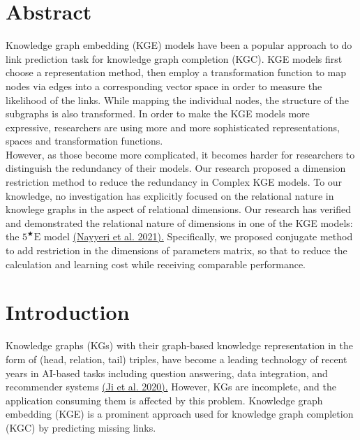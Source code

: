 \documentclass[9pt]{ctexart}
\theoremstyle{definition}
\begin{document}

\section{Abstract}
Knowledge graph embedding (KGE) models have been a popular approach to do link prediction task for knowledge graph completion (KGC).
KGE models first choose a representation method, then employ a transformation function to map nodes via edges into a corresponding vector space in order to measure the likelihood of the links.
While mapping the individual nodes, the structure of the subgraphs is also transformed.
In order to make the KGE models more expressive, researchers are using more and more sophisticated representations, spaces and transformation functions.\\
However, as those become more complicated, it becomes harder for researchers to distinguish the redundancy of their models.
Our research proposed a dimension restriction method to reduce the redundancy in Complex KGE models.
To our knowledge, no investigation has explicitly focused on the relational nature in knowlege graphs in the aspect of relational dimensions.
Our research has verified and demonstrated the relational nature of dimensions in one of the KGE models: the $5^{\bigstar}\mathrm{E}$ model
\hyperlink{Nay21}{(Nayyeri et al. 2021).}
Specifically, we proposed conjugate method to add restriction in the dimensions of parameters matrix, so that to reduce the calculation and learning cost while receiving comparable performance.

\section{Introduction}
Knowledge graphs (KGs) with their graph-based knowledge representation in the form of (head, relation, tail) triples, have become a leading technology of recent years in AI-based tasks including question answering, data integration, and recommender systems 
\hyperlink{JiS20}{(Ji et al. 2020).} 
However, KGs are incomplete, and the application consuming them is affected by this problem.
Knowledge graph embedding (KGE) is a prominent approach used for knowledge graph completion (KGC) by predicting missing links.
\end{document}
